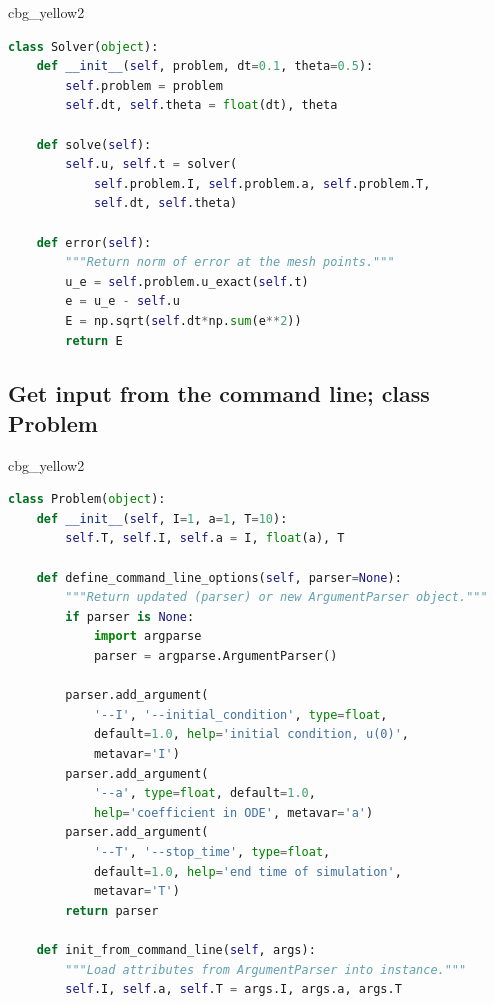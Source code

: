 \documentclass[%
oneside,                 %
final,                   %
10pt]{article}
\newenvironment{_cod_tight}[1]{
   \def\FrameCommand{\colorbox{#1}}
   \FrameRule0.6pt\MakeFramed {\FrameRestore}\vskip3mm}
   {\vskip0mm\endMakeFramed}
\newenvironment{cod}[1]{
\bgroup\rmfamily
\fboxsep=0mm\relax
\begin{_cod_tight}{#1}
\list{}{\parsep=-2mm\parskip=0mm\topsep=0pt\leftmargin=2mm
\rightmargin=2\leftmargin\leftmargin=4pt\relax}
\item\relax}
{\endlist\end{_cod_tight}\egroup}
\begin{document}
\begin{cod}{cbg_yellow2}\begin{lstlisting}[language=Python,style=simple,xleftmargin=2mm]
class Solver(object):
    def __init__(self, problem, dt=0.1, theta=0.5):
        self.problem = problem
        self.dt, self.theta = float(dt), theta

    def solve(self):
        self.u, self.t = solver(
            self.problem.I, self.problem.a, self.problem.T,
            self.dt, self.theta)

    def error(self):
        """Return norm of error at the mesh points."""
        u_e = self.problem.u_exact(self.t)
        e = u_e - self.u
        E = np.sqrt(self.dt*np.sum(e**2))
        return E
\end{lstlisting}\end{cod}
\noindent

\subsection*{Get input from the command line; class Problem}

\begin{cod}{cbg_yellow2}\begin{lstlisting}[language=Python,style=simple,xleftmargin=2mm]
class Problem(object):
    def __init__(self, I=1, a=1, T=10):
        self.T, self.I, self.a = I, float(a), T

    def define_command_line_options(self, parser=None):
        """Return updated (parser) or new ArgumentParser object."""
        if parser is None:
            import argparse
            parser = argparse.ArgumentParser()

        parser.add_argument(
            '--I', '--initial_condition', type=float,
            default=1.0, help='initial condition, u(0)',
            metavar='I')
        parser.add_argument(
            '--a', type=float, default=1.0,
            help='coefficient in ODE', metavar='a')
        parser.add_argument(
            '--T', '--stop_time', type=float,
            default=1.0, help='end time of simulation',
            metavar='T')
        return parser

    def init_from_command_line(self, args):
        """Load attributes from ArgumentParser into instance."""
        self.I, self.a, self.T = args.I, args.a, args.T
\end{lstlisting}\end{cod}
\noindent
\end{document}
